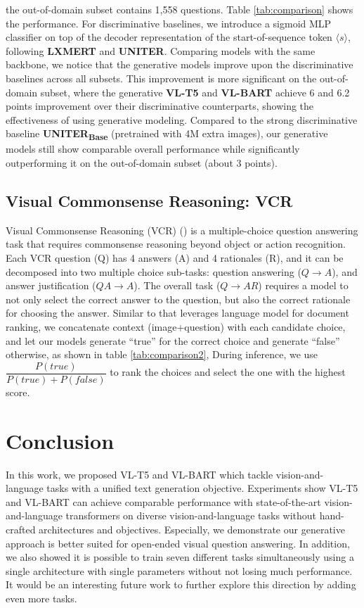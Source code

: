 \documentclass[twocolumn,3p,a4paper,preprint,11pt,margin=2.5cm]{elsarticle}
\begin{document}
the out-of-domain subset contains 1,558 questions. Table \ref{tab:comparison} shows the performance. For discriminative baselines, we introduce a sigmoid MLP classifier on top of the decoder representation of the start-of-sequence token $\langle s \rangle$, following \textbf{LXMERT} and \textbf{UNITER}. Comparing models with the same backbone, we notice that the generative models improve upon the discriminative baselines across all subsets. This improvement is more significant on the out-of-domain subset, where the generative \textbf{VL-T5} and \textbf{VL-BART} achieve 6 and 6.2 points improvement over their discriminative counterparts, showing the effectiveness of using generative modeling. Compared to the strong discriminative baseline \textbf{UNITER\textsubscript{Base}} (pretrained with 4M extra images), our generative models still show comparable overall performance while significantly outperforming it on the out-of-domain subset (about 3 points).

\subsection{Visual Commonsense Reasoning: VCR}
Visual Commonsense Reasoning (VCR) (\cite{ZhichengHuang}) is a multiple-choice question answering task that
requires commonsense reasoning beyond object or action
recognition. Each VCR question (Q) has 4 answers (A)
and 4 rationales (R), and it can be decomposed into two
multiple choice sub-tasks: question answering ($Q \rightarrow A$), and answer justification ($QA \rightarrow A$). The overall task ($Q \rightarrow AR$) requires a model to not only select the correct answer to the question, but also the correct rationale for choosing the answer. Similar to that leverages language model for document ranking, we concatenate context (image+question) with each candidate choice, and let our models generate “true” for the correct choice and generate “false” otherwise, as shown in table \ref{tab:comparison2}, During inference, we use $\dfrac{P(true)}{P(true)+P(false)}$ to rank the choices and select the one with the highest score.\\[0.4 cm]
\section{\Large{Conclusion}}
In this work, we proposed VL-T5 and VL-BART which
tackle vision-and-language tasks with a unified text generation objective. Experiments show VL-T5 and VL-BART
can achieve comparable performance with state-of-the-art
vision-and-language transformers on diverse vision-and-language tasks without hand-crafted architectures and objectives. Especially, we demonstrate our generative approach
is better suited for open-ended visual question answering.
In addition, we also showed it is possible to train seven different tasks simultaneously using a single architecture with
single parameters without not losing much performance. It
would be an interesting future work to further explore this
direction by adding even more tasks.


\printbibliography
\end{document}
